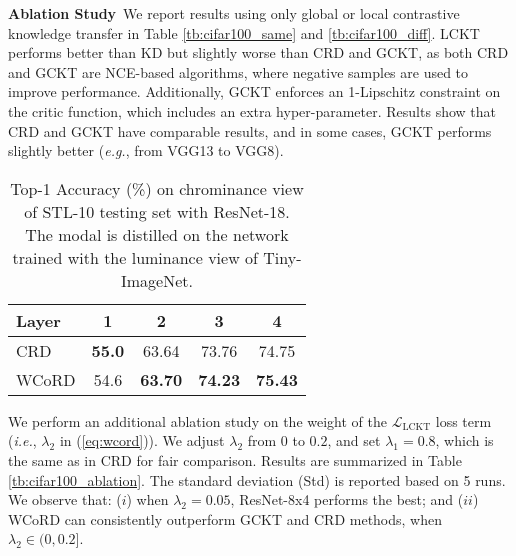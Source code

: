 \documentclass[final]{cvpr}
\newcommand{\Lcal}{\mathcal{L}}
\theoremstyle{definition}
\begin{document}
\vspace{5pt}
\noindent\textbf{Ablation Study}\,
We report results using only global or local contrastive knowledge transfer in Table \ref{tb:cifar100_same} and \ref{tb:cifar100_diff}. 
LCKT performs better than KD but slightly worse than CRD and GCKT, as both
CRD and GCKT are NCE-based algorithms, where negative samples are used to improve performance.
Additionally, GCKT enforces an 1-Lipschitz constraint on the critic function, which includes an extra hyper-parameter. 
Results show that CRD and GCKT have comparable results, and
in some cases, GCKT performs slightly better (\emph{e.g.}, from VGG13 to VGG8).

\begin{table}[t!]
\small
\begin{center}
    \caption{
    \small{CIFAR-100 test accuracy (\%) of student network ResNet-8x4 with different weights on the local knowledge transfer term. The teacher network is ResNet-32x4.}
    }
\label{tb:cifar100_ablation}
\end{center}
\vspace{-4mm}
\end{table} \begin{table}[t!]
\small
\begin{center}
\begin{tabular}{l|cccc}
\toprule
 Layer  & 1 & 2 & 3 & 4 \\
\midrule
CRD & \textbf{55.0} & 63.64 & 73.76    & 74.75    \\
WCoRD & 54.6 & \textbf{63.70}   & \textbf{74.23}    & \textbf{75.43} \\

\bottomrule
\end{tabular}
\caption{
    \small{Top-1 Accuracy (\%) on chrominance view of STL-10 testing set with ResNet-18. The modal is distilled on the network trained with the luminance view of Tiny-ImageNet. }
    }
\label{tb:crossmodal}
\end{center}
\vspace{-7mm}
\end{table} We perform an additional ablation study on the weight of the $\Lcal_{\text{LCKT}}$ loss term (\emph{i.e.}, $\lambda_2$ in (\ref{eq:wcord})). We adjust $\lambda_2$ from $0$ to $0.2$, and set $\lambda_1=0.8$, which is the same as in CRD for fair comparison.
  Results are summarized in Table \ref{tb:cifar100_ablation}. The standard deviation (Std) is reported based on 5 runs.
We observe that:
($i$) when $\lambda_2=0.05$, ResNet-8x4 performs the best; and ($ii$) WCoRD can consistently outperform GCKT and CRD methods, when $\lambda_2\in(0,0.2]$. 
\end{document}
